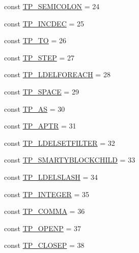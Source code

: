 \begin{DoxyCompactItemize}
\item 
const \hyperlink{class_smarty___internal___templateparser_ae9013172863287b01bd2288cd8ca0f7c}{T\+P\+\_\+\+S\+E\+M\+I\+C\+O\+L\+O\+N} = 24
\item 
const \hyperlink{class_smarty___internal___templateparser_ac76f1738fd1a58e51ee33970a4ddb251}{T\+P\+\_\+\+I\+N\+C\+D\+E\+C} = 25
\item 
const \hyperlink{class_smarty___internal___templateparser_a6279bdd20c601763ae18b19e4959d1e3}{T\+P\+\_\+\+T\+O} = 26
\item 
const \hyperlink{class_smarty___internal___templateparser_a3cabca07321bbbcfdedb5cf431200828}{T\+P\+\_\+\+S\+T\+E\+P} = 27
\item 
const \hyperlink{class_smarty___internal___templateparser_a6b37486868f61165590c7480cf641957}{T\+P\+\_\+\+L\+D\+E\+L\+F\+O\+R\+E\+A\+C\+H} = 28
\item 
const \hyperlink{class_smarty___internal___templateparser_aff0f53a369964353f62ec1b04e605881}{T\+P\+\_\+\+S\+P\+A\+C\+E} = 29
\item 
const \hyperlink{class_smarty___internal___templateparser_af5f3d0cb3f43db7346bab0d01a4a7968}{T\+P\+\_\+\+A\+S} = 30
\item 
const \hyperlink{class_smarty___internal___templateparser_aa34cdef96a9c0962cf6e731448702eee}{T\+P\+\_\+\+A\+P\+T\+R} = 31
\item 
const \hyperlink{class_smarty___internal___templateparser_aafb9f7bc165567aac050894791e7a29c}{T\+P\+\_\+\+L\+D\+E\+L\+S\+E\+T\+F\+I\+L\+T\+E\+R} = 32
\item 
const \hyperlink{class_smarty___internal___templateparser_a3047912f4b3cb8e953c0e6ac442fe7e5}{T\+P\+\_\+\+S\+M\+A\+R\+T\+Y\+B\+L\+O\+C\+K\+C\+H\+I\+L\+D} = 33
\item 
const \hyperlink{class_smarty___internal___templateparser_a7d661b14537f06a13513c1bbba537063}{T\+P\+\_\+\+L\+D\+E\+L\+S\+L\+A\+S\+H} = 34
\item 
const \hyperlink{class_smarty___internal___templateparser_a5102292f3998eb4c435a8ede54f79fc5}{T\+P\+\_\+\+I\+N\+T\+E\+G\+E\+R} = 35
\item 
const \hyperlink{class_smarty___internal___templateparser_a4356428ff52497132963f29262491f7b}{T\+P\+\_\+\+C\+O\+M\+M\+A} = 36
\item 
const \hyperlink{class_smarty___internal___templateparser_af1769f7267d6dbb10148cdf50e5162dc}{T\+P\+\_\+\+O\+P\+E\+N\+P} = 37
\item 
const \hyperlink{class_smarty___internal___templateparser_a4c4fac73c2660805ed8b122eaaf4a312}{T\+P\+\_\+\+C\+L\+O\+S\+E\+P} = 38

\end{DoxyCompactItemize}
